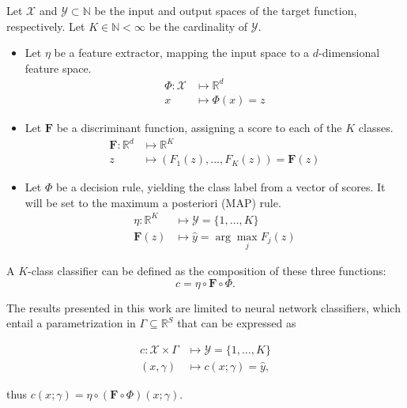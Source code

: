 \begin{definition}[Classifier]\label{def:classifier}
    Let $\mathcal{X}$ and $\mathcal{Y} \subset\mathbb{N}$ be the input and output spaces of the target function, respectively.
    Let $K \in \mathbb{N} < \infty$ be the cardinality of $\mathcal{Y}$.

    \begin{itemize}
        \item Let $\eta$ be a feature extractor, mapping the input space to a $d$-dimensional feature space.
            $$ 
            \begin{aligned}
                \Phi: \mathcal{X} & \longmapsto \mathbb{R}^d \\
                x & \longmapsto \Phi(x) = z
            \end{aligned}
            $$

        \item Let $\bm{F}$ be a discriminant function, assigning a score
        to each of the $K$ classes. 
            $$
            \begin{aligned}
                \bm{F}: \mathbb{R}^d  & \longmapsto \mathbb{R}^K \\
                z & \longmapsto \left ( F_1(z), \dots, F_K(z) \right ) = \bm{F}(z)
            \end{aligned}
            $$
        \item Let $\Phi$ be a decision rule, yielding the class label from a vector of scores.
        It will be set to the maximum a posteriori (MAP) rule.
            $$
                \begin{aligned}
                    \eta: \mathbb{R}^K & \longmapsto \mathcal{Y} = \{1, \dots, K \} \\
                    \bm{F}(z) & \longmapsto \hat{y} = \arg \max_{j} F_j(z)
                \end{aligned}
            $$
    \end{itemize}

    A $K$-class classifier can be defined as the composition of these three functions:
    $$
    c = \eta \circ \bm{F} \circ \Phi.
    $$

    The results presented in this work are limited to neural network classifiers, which
    entail a parametrization in $\Gamma \subseteq \mathbb{R}^{S}$ that can be expressed
    as

    $$
        \begin{aligned}
        c: \mathcal{X} \times \Gamma & \longmapsto \mathcal{Y} = \{1, \dots, K \} \\
        (x, \gamma) & \longmapsto c(x; \gamma) = \hat{y},
        \end{aligned}
    $$

    thus $c(x; \gamma) = \eta \circ (\bm{F} \circ \Phi)(x; \gamma)$. \\
\end{definition}





